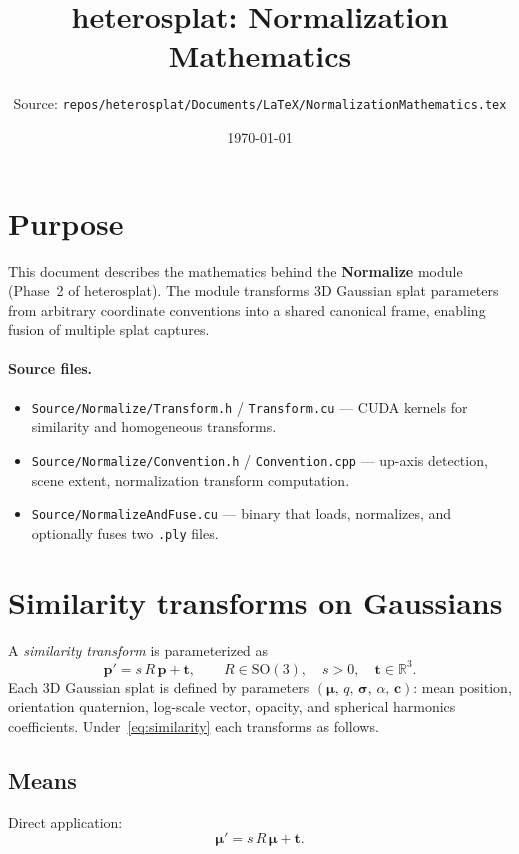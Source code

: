 \documentclass[11pt]{article}
\title{heterosplat: Normalization Mathematics}
\author{Source: \texttt{repos/heterosplat/Documents/LaTeX/NormalizationMathematics.tex}}
\date{\today}
\newcommand{\SO}{\mathrm{SO}}
\newcommand{\R}{\mathbb{R}}
\begin{document}
\maketitle

\section{Purpose}

This document describes the mathematics behind the \textbf{Normalize} module
(Phase~2 of heterosplat). The module transforms 3D Gaussian splat parameters
from arbitrary coordinate conventions into a shared canonical frame, enabling
fusion of multiple splat captures.

\paragraph{Source files.}
\begin{itemize}
  \item \texttt{Source/Normalize/Transform.h} / \texttt{Transform.cu} ---
        CUDA kernels for similarity and homogeneous transforms.
  \item \texttt{Source/Normalize/Convention.h} / \texttt{Convention.cpp} ---
        up-axis detection, scene extent, normalization transform computation.
  \item \texttt{Source/NormalizeAndFuse.cu} --- binary that loads, normalizes,
        and optionally fuses two \texttt{.ply} files.
\end{itemize}

\section{Similarity transforms on Gaussians}
\label{sec:similarity}

A \emph{similarity transform} is parameterized as
\begin{equation}
  \mathbf{p}' = s \, R \, \mathbf{p} + \mathbf{t},
  \qquad R \in \SO(3),\quad s > 0,\quad \mathbf{t} \in \R^3.
  \label{eq:similarity}
\end{equation}
Each 3D Gaussian splat is defined by parameters
$(\boldsymbol{\mu},\, q,\, \boldsymbol{\sigma},\, \alpha,\, \mathbf{c})$:
mean position, orientation quaternion, log-scale vector, opacity, and
spherical harmonics coefficients. Under~\eqref{eq:similarity} each transforms
as follows.

\subsection{Means}
Direct application:
\begin{equation}
  \boldsymbol{\mu}' = s \, R \, \boldsymbol{\mu} + \mathbf{t}.
\end{equation}
\end{document}
